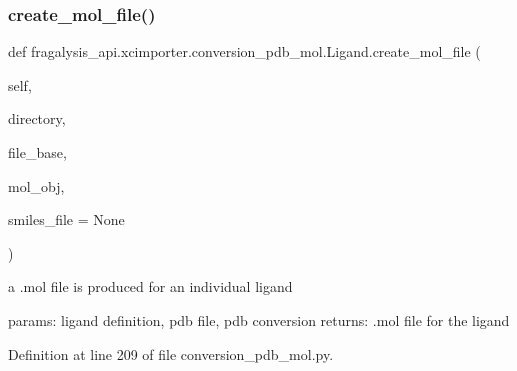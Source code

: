 \mbox{\label{classfragalysis__api_1_1xcimporter_1_1conversion__pdb__mol_1_1_ligand_a811498c568a5f12e8047ced3640a3c90}} 
\subsubsection{\texorpdfstring{create\+\_\+mol\+\_\+file()}{create\_mol\_file()}}
{\footnotesize\ttfamily def fragalysis\+\_\+api.\+xcimporter.\+conversion\+\_\+pdb\+\_\+mol.\+Ligand.\+create\+\_\+mol\+\_\+file (\begin{DoxyParamCaption}\item[{}]{self,  }\item[{}]{directory,  }\item[{}]{file\+\_\+base,  }\item[{}]{mol\+\_\+obj,  }\item[{}]{smiles\+\_\+file = {\ttfamily None} }\end{DoxyParamCaption})}

\begin{DoxyVerb}a .mol file is produced for an individual ligand

params: ligand definition, pdb file, pdb conversion
returns: .mol file for the ligand
\end{DoxyVerb}
 

Definition at line 209 of file conversion\+\_\+pdb\+\_\+mol.\+py.


